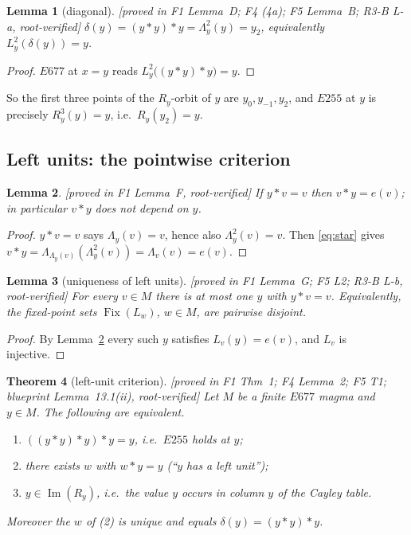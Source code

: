 \documentclass[11pt]{article}
\theoremstyle{plain}
\newtheorem{theorem}{Theorem}[section]
\newtheorem{lemma}[theorem]{Lemma}
\theoremstyle{definition}
\theoremstyle{remark}
\numberwithin{equation}{section}
\newcommand{\op}{\mathbin{*}}
\newcommand{\Fix}{\operatorname{Fix}}
\newcommand{\Imm}{\operatorname{Im}}
\newcommand{\statusbox}[1]{{\small\sloppy\textsf{[#1]}}}
\newcommand{\PROVED}[1]{\statusbox{proved in #1, root-verified}}
\begin{document}
\begin{lemma}[diagonal]\label{lem:diag}
\PROVED{F1 Lemma~D; F4 (4a); F5 Lemma~B; R3-B L-a}
$\delta(y) = (y\op y)\op y = \Lambda_y^2(y) = y_2$, equivalently $L_y^2(\delta(y)) = y$.
\end{lemma}

\begin{proof}
$E677$ at $x=y$ reads $L_y^2\bigl((y\op y)\op y\bigr) = y$.
\end{proof}

So the first three points of the $R_y$-orbit of $y$ are $y_0, y_{-1}, y_2$, and $E255$ at
$y$ is precisely $R_y^3(y) = y$, i.e.\ $R_y(y_2) = y$.

\subsection{Left units: the pointwise criterion}

\begin{lemma}\label{lem:F}
\PROVED{F1 Lemma~F}
If $y\op v = v$ then $v\op y = e(v)$; in particular $v\op y$ does not depend on $y$.
\end{lemma}

\begin{proof}
$y\op v = v$ says $\Lambda_y(v) = v$, hence also $\Lambda_y^2(v) = v$. Then \eqref{eq:star}
gives $v\op y = \Lambda_{\Lambda_y(v)}(\Lambda_y^2(v)) = \Lambda_v(v) = e(v)$.
\end{proof}

\begin{lemma}[uniqueness of left units]\label{lem:G}
\PROVED{F1 Lemma~G; F5 L2; R3-B L-b}
For every $v\in M$ there is at most one $y$ with $y\op v = v$. Equivalently, the fixed-point
sets $\Fix(L_w)$, $w\in M$, are pairwise disjoint.
\end{lemma}

\begin{proof}
By Lemma~\ref{lem:F} every such $y$ satisfies $L_v(y) = e(v)$, and $L_v$ is injective.
\end{proof}

\begin{theorem}[left-unit criterion]\label{thm:leftunit}
\PROVED{F1 Thm~1; F4 Lemma~2; F5 T1; blueprint Lemma~13.1(ii)}
Let $M$ be a finite $E677$ magma and $y\in M$. The following are equivalent.
\begin{enumerate}
\item $((y\op y)\op y)\op y = y$, i.e.\ $E255$ holds at $y$;
\item there exists $w$ with $w\op y = y$ (``$y$ has a left unit'');
\item $y \in \Imm(R_y)$, i.e.\ the value $y$ occurs in column $y$ of the Cayley table.
\end{enumerate}
Moreover the $w$ of (2) is unique and equals $\delta(y) = (y\op y)\op y$.
\end{theorem}
\end{document}
